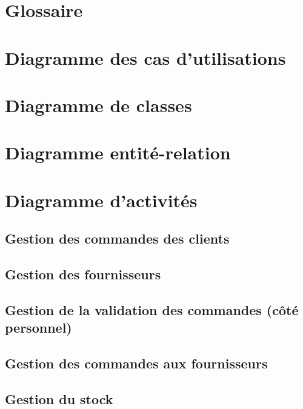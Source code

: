 \documentclass[a4paper, 11pt]{article}
\begin{document}
\clearpage
\begin{appendices}

\section{Glossaire}

\section{Diagramme des cas d'utilisations}

\section{Diagramme de classes}

\section{Diagramme entité-relation}

\section{Diagramme d'activités}

\subsection{Gestion des commandes des clients}
\subsection{Gestion des fournisseurs}
\subsection{Gestion de la validation des commandes (côté personnel)}
\subsection{Gestion des commandes aux fournisseurs}
\subsection{Gestion du stock}

\end{appendices}
\end{document}
